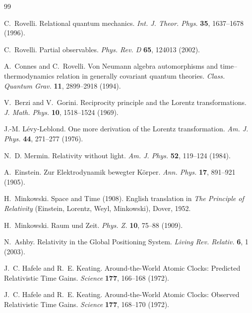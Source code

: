 \documentclass[12pt]{article}
\begin{document}
\begin{thebibliography}{99}

C.~Rovelli.
\newblock Relational quantum mechanics.
\newblock \emph{Int. J. Theor. Phys.} \textbf{35}, 1637--1678 (1996).

C.~Rovelli.
\newblock Partial observables.
\newblock \emph{Phys. Rev. D} \textbf{65}, 124013 (2002).

A.~Connes and C.~Rovelli.
\newblock Von Neumann algebra automorphisms and time–thermodynamics relation in generally covariant quantum theories.
\newblock \emph{Class. Quantum Grav.} \textbf{11}, 2899--2918 (1994).

V.~Berzi and V.~Gorini.
\newblock Reciprocity principle and the Lorentz transformations.
\newblock \emph{J. Math. Phys.} \textbf{10}, 1518--1524 (1969).

J.-M. L\'evy-Leblond.
\newblock One more derivation of the Lorentz transformation.
\newblock \emph{Am. J. Phys.} \textbf{44}, 271--277 (1976).

N.~D. Mermin.
\newblock Relativity without light.
\newblock \emph{Am. J. Phys.} \textbf{52}, 119--124 (1984).

A.~Einstein.
\newblock Zur Elektrodynamik bewegter K\"orper.
\newblock \emph{Ann. Phys.} \textbf{17}, 891--921 (1905).

H.~Minkowski.
\newblock Space and Time (1908). English translation in \emph{The Principle of
Relativity} (Einstein, Lorentz, Weyl, Minkowski), Dover, 1952.

H.~Minkowski.
\newblock Raum und Zeit.
\newblock \emph{Phys. Z.} \textbf{10}, 75--88 (1909).

N.~Ashby.
\newblock Relativity in the Global Positioning System.
\newblock \emph{Living Rev. Relativ.} \textbf{6}, 1 (2003).

J.~C. Hafele and R.~E. Keating.
\newblock Around-the-World Atomic Clocks: Predicted Relativistic Time Gains.
\newblock \emph{Science} \textbf{177}, 166--168 (1972).

J.~C. Hafele and R.~E. Keating.
\newblock Around-the-World Atomic Clocks: Observed Relativistic Time Gains.
\newblock \emph{Science} \textbf{177}, 168--170 (1972).


\end{thebibliography}
\end{document}
